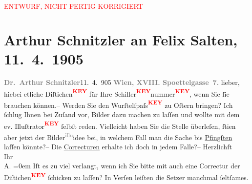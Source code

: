 
\begin{center}
            \textcolor{red}{ENTWURF, NICHT FERTIG KORRIGIERT}
                      \end{center}
            
         
         \renewcommand{\erwaehntePersonen}{Personen: Felix Salten}
         \renewcommand{\erwaehnteOrte}{Orte: Edmund-Weiß-Gasse, Wien}
         \renewcommand{\erwaehnteWerke}{}
               \section[Arthur Schnitzler an Felix Salten, 11. 4. 1905]{ Arthur Schnitzler an Felix Salten, 11. 4. 1905}\nopagebreak{}\rehead{ }\begin{ledgroupsized}[t]{13cm}\normalsize\beginnumbering \toendnotes[C]{\smallbreak\pagebreak[2]} 
\toendnotes[C]{\smallbreak}\pstart
           \noindent{}\textcolor{gray}{\textbf{{\pb}Dr. Arthur Schnitzler}}\hfill 11. 4. 905\pend
           \pstart
           \textcolor{gray}{\textbf{Wien, XVIII.
                        Spoettelgasse 7.}}\pend
           \pstart
           lieber, hiebei etliche Diſtichen\textcolor{red}{\textsuperscript{\textbf{KEY}}} für Ihre Schiller\textcolor{red}{\textsuperscript{\textbf{KEY}}}nummer\textcolor{red}{\textsuperscript{\textbf{KEY}}}, wenn Sie ſie brauchen können.– \pend
           \pstart
           Werden Sie den Wurſtelſpaſs\textcolor{red}{\textsuperscript{\textbf{KEY}}} zu
                  Oſtern bringen? Ich ſchlug Ihnen bei Zuſand vor, Bilder dazu machen
               zu laſſen und wollte mit dem ev. Illuſtrator\textcolor{red}{\textsuperscript{\textbf{KEY}}} ſelbſt reden. Vielleicht haben Sie die Stelle überleſen, ſti{\geminationm}en aber jetzt {\pb}
               der Bilder\substVorne{}\textsuperscript{\textcolor{gray}{illu}}\substDazwischen{}idee\substHinten{} bei, in welchem Fall man die Sache bis \uline{Pfingſten}\pend
           \pstart
           laſſen könnte?– \pend
           \pstart
           Die \uline{Correcturen} erhalte ich doch in jedem Falle?– \pend
           \pstart
           Herzlichſt {\\[\baselineskip]}Ihr {\\[\baselineskip]}\spacefill\mbox{A.}\pend
           \leftskip=0em{}\pstart
            Iſt es zu viel verlangt, wenn ich Sie bitte mit auch eine Correctur der Diſtichen\textcolor{red}{\textsuperscript{\textbf{KEY}}} ſchicken zu laſſen? In Verſen leiſten die Setzer
                  {\pb}manchmal ſeltſames. \pend
           
         
         \endnumbering{}\end{ledgroupsized}\begin{anhang}\end{anhang}\newcommand{\dateiname}{L02998}\newcommand{\titel}{Arthur Schnitzler an Felix Salten, 11. 4. 1905}\newcommand{\editorInnen}{Martin Anton Müller und Laura Untner}
      